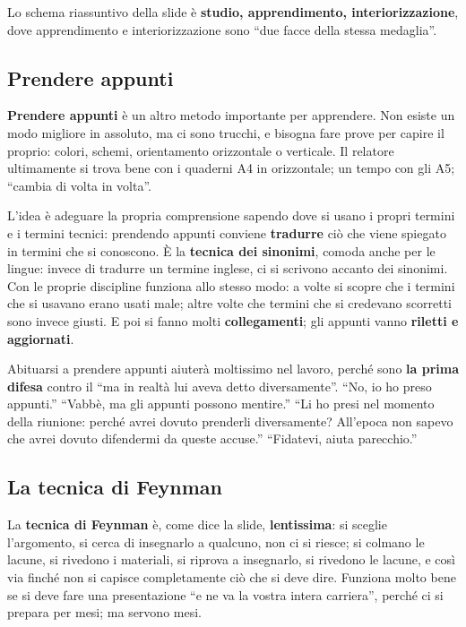 Lo schema riassuntivo della slide è \textbf{studio, apprendimento,
interiorizzazione}, dove apprendimento e interiorizzazione sono ``due facce
della stessa medaglia''.

\subsection{Prendere appunti}

\textbf{Prendere appunti} è un altro metodo importante per apprendere. Non
esiste un modo migliore in assoluto, ma ci sono trucchi, e bisogna fare
prove per capire il proprio: colori, schemi, orientamento orizzontale o
verticale. Il relatore ultimamente si trova bene con i quaderni A4 in
orizzontale; un tempo con gli A5; ``cambia di volta in volta''.

L'idea è adeguare la propria comprensione sapendo dove si usano i propri
termini e i termini tecnici: prendendo appunti conviene \textbf{tradurre}
ciò che viene spiegato in termini che si conoscono. È la \textbf{tecnica
dei sinonimi}, comoda anche per le lingue: invece di tradurre un termine
inglese, ci si scrivono accanto dei sinonimi. Con le proprie discipline
funziona allo stesso modo: a volte si scopre che i termini che si usavano
erano usati male; altre volte che termini che si credevano scorretti sono
invece giusti. E poi si fanno molti \textbf{collegamenti}; gli appunti vanno
\textbf{riletti e aggiornati}.

Abituarsi a prendere appunti aiuterà moltissimo nel lavoro, perché sono
\textbf{la prima difesa} contro il ``ma in realtà lui aveva detto
diversamente''. ``No, io ho preso appunti.'' ``Vabbè, ma gli appunti
possono mentire.'' ``Li ho presi nel momento della riunione: perché avrei
dovuto prenderli diversamente? All'epoca non sapevo che avrei dovuto
difendermi da queste accuse.'' ``Fidatevi, aiuta parecchio.''

\subsection{La tecnica di Feynman}

La \textbf{tecnica di Feynman} è, come dice la slide, \textbf{lentissima}:
si sceglie l'argomento, si cerca di insegnarlo a qualcuno, non ci si
riesce; si colmano le lacune, si rivedono i materiali, si riprova a
insegnarlo, si rivedono le lacune, e così via finché non si capisce
completamente ciò che si deve dire. Funziona molto bene se si deve fare una
presentazione ``e ne va la vostra intera carriera'', perché ci si prepara
per mesi; ma servono mesi.

